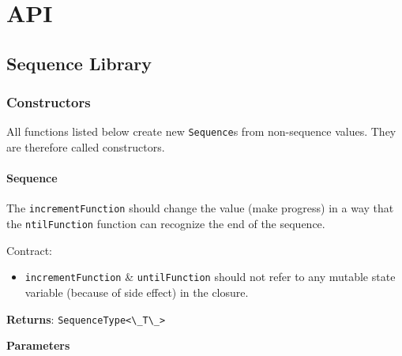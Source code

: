 \chapter{API}
\label{chap:app_API}

\newcommand{\passthrough}[1]{#1}

\providecommand{\tightlist}{%
  \setlength{\itemsep}{0pt}\setlength{\parskip}{0pt}}

\hypertarget{api}{%
\section{Sequence Library}\label{api}}

\hypertarget{fa229d10-532a-4f04-9805-8fdc4881587a}{%
\subsection{Constructors}\label{sub:appendix_constructors} }

All functions listed below create new
\passthrough{\lstinline!Sequence!}s from non-sequence values. They are
therefore called constructors.

\hypertarget{6a313d03-9822-4a0c-a825-1a6a51264d55}{%
\subsubsection{Sequence}\label{6a313d03-9822-4a0c-a825-1a6a51264d55}}

The \passthrough{\lstinline!incrementFunction!} should change the value
(make progress) in a way that the \passthrough{\lstinline!ntilFunction!}
function can recognize the end of the sequence.

Contract:

\begin{itemize}
\tightlist
\item
  \passthrough{\lstinline!incrementFunction!} \&
  \passthrough{\lstinline!untilFunction!} should not refer to any
  mutable state variable (because of side effect) in the closure.
\end{itemize}

\textbf{Returns}: \passthrough{\lstinline!SequenceType<\_T\_>!}

\textbf{Parameters}


